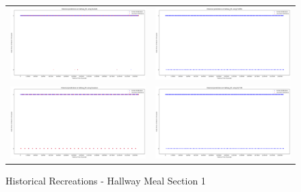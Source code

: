 \begin{figure}
  \begin{tabular}{cc}
    {\includegraphics[width = 3in]{images/results/Historical_hallway_M1_Duckett.png}} &
    {\includegraphics[width = 3in]{images/results/Historical_hallway_M1_FreMEn.png}} \\
    {\includegraphics[width = 3in]{images/results/Historical_hallway_M1_Gaussian.png}} &
    {\includegraphics[width = 3in]{images/results/Historical_hallway_M1_HyT-EM.png}} \\
  \end{tabular}
  \caption{Historical Recreations - Hallway Meal Section 1}
\end{figure}\\ \\

